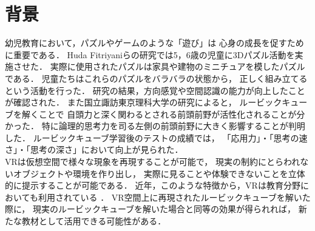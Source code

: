 \section{背景}
  幼児教育において，パズルやゲームのような「遊び」は
  心身の成長を促すために重要である\cite{joy}．
  Huda Fitriyaniらの研究\cite{puzzle}では5，6歳の児童に3Dパズル活動を実施させた．
  実際に使用されたパズルは家具や建物のミニチュアを模したパズルである．
  児童たちはこれらのパズルをバラバラの状態から，
  正しく組み立てるという活動を行った．
  研究の結果，方向感覚や空間認識の能力が向上したことが確認された．
  また国立諏訪東京理科大学の研究\cite{rubik}によると，
  ルービックキューブを解くことで
  自頭力と深く関わるとされる前頭前野が活性化されることが分かった．
  特に論理的思考力を司る左側の前頭前野に大きく影響することが判明した．
  ルービックキューブ学習後のテストの成績では，
  「応用力」・「思考の速さ」・「思考の深さ」において向上が見られた．
  \\\indent
  VRは仮想空間で様々な現象を再現することが可能で，
  現実の制約にとらわれないオブジェクトや環境を作り出し，
  実際に見ることや体験できないことを立体的に提示することが可能である．
  近年，このような特徴から，VRは教育分野においても利用されている
  \cite{全天球}\cite{授業実践}．
  VR空間上に再現されたルービックキューブを解いた際に，
  現実のルービックキューブを解いた場合と同等の効果が得られれば，
  新たな教材として活用できる可能性がある．
